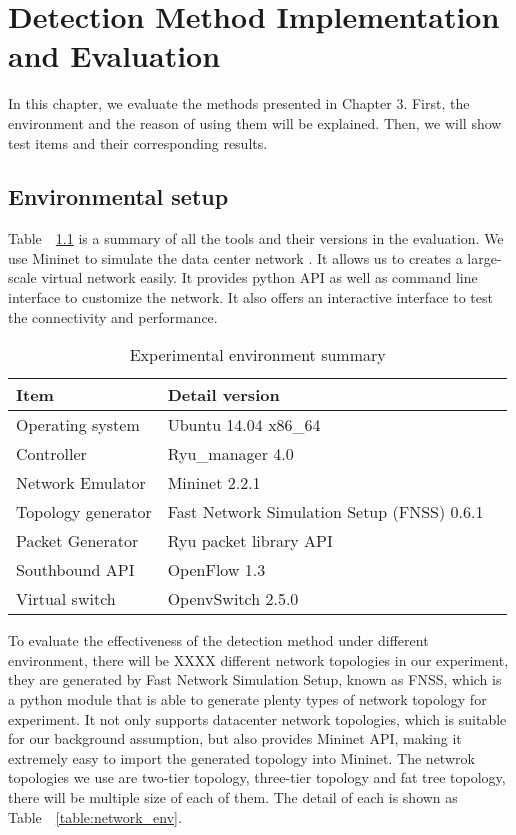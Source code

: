 \chapter{Detection Method Implementation and Evaluation}
In this chapter, we evaluate the methods presented in Chapter 3. First, the environment and the reason of using them will be explained. Then, we will show test items and their corresponding results.

\section{Environmental setup}
Table~~\ref{table:Experiment_table} is a summary of all the tools and their versions in the evaluation. We use Mininet to simulate the data center network \cite{Mininet}. It allows us to creates a large-scale virtual network easily. It provides python API as well as command line interface to customize the network. It also offers an interactive interface to test the connectivity and performance.

\begin{table}[H]
\centering
\caption{Experimental environment summary}
\begin{tabular}{|l|p{4cm}|p{4.5cm}}
\hline Item & Detail version \\
\hline Operating system & Ubuntu 14.04 x86\_64 \\
\hline Controller & Ryu\_manager 4.0 \\
\hline Network Emulator & Mininet 2.2.1 \\
\hline Topology generator & Fast Network Simulation Setup (FNSS) 0.6.1\\
\hline Packet Generator & Ryu packet library API \\
\hline Southbound API & OpenFlow 1.3 \\
\hline Virtual switch & OpenvSwitch 2.5.0 \\
\hline 
\end{tabular}
\label{table:Experiment_table}
\end{table}

To evaluate the effectiveness of the detection method under different environment, there will be XXXX different network topologies in our experiment, they are generated by Fast Network Simulation Setup, known as FNSS, which is a python module that is able to generate plenty types of network topology for experiment. It not only supports datacenter network topologies, which is suitable for our background assumption, but also provides Mininet API, making it extremely easy to import the generated topology into Mininet. The netwrok topologies we use are two-tier topology, three-tier topology and fat tree topology, there will be multiple size of each of them. The detail of each is shown as Table~~\ref{table:network_env}.

